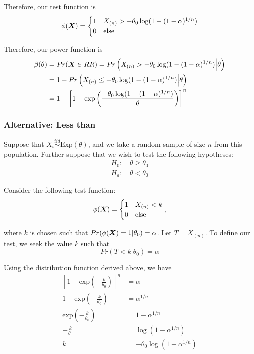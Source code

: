 \documentclass[]{article}
\newcommand{\bfX}{\mbox{\boldmath $X$}}
\begin{document}
Therefore, our test function is
\[
\phi(\bfX) = \begin{cases}
1 & X_{(n)} > -\theta_0\log(1 - (1-\alpha)^{1/n}) \\
0 & \text{else}
\end{cases}
\]

Therefore, our power function is
\[
\begin{split}
\beta(\theta) &= Pr(\bfX \in RR) = Pr\left(X_{(n)} > -\theta_0\log(1 - (1-\alpha)^{1/n}) \Big| \theta\right) \\
&= 1 - Pr\left(X_{(n)}\leq -\theta_0\log(1 - (1-\alpha)^{1/n}) \Big| \theta\right) \\
&= 1 - \left[1 - \text{exp}\left(\frac{-\theta_0\log(1 - (1-\alpha)^{1/n})}{\theta}\right)\right]^n
\end{split}
\]


\subsubsection{Alternative: Less than}

Suppose that $X_i \stackrel{iid}{\sim} \text{Exp}(\theta)$, and we take a random sample of size $n$ from this population. Further suppose that we wish to test the following hypotheses:
\[
\begin{split}
\text{$H_0$: }& \theta \geq \theta_0 \\
\text{$H_a$: }& \theta < \theta_0
\end{split}
\]

Consider the following test function:
\[
\phi(\bfX) = \begin{cases}
1 & X_{(n)} < k \\
0 & \text{else}
\end{cases},
\]

where $k$ is chosen such that $Pr(\phi(\bfX) = 1|\theta_0) = \alpha$. Let $T = X_{(n)}$. To define our test, we seek the value $k$ such that 
\[
Pr(T < k | \theta_0) = \alpha
\]

Using the distribution function derived above, we have
\[
\begin{split}
\left[1 - \text{exp}(-\frac{k}{\theta_0})\right]^n &= \alpha \\
1 - \text{exp}(-\frac{k}{\theta_0}) &= \alpha^{1/n} \\
\text{exp}(-\frac{k}{\theta_0}) &= 1 - \alpha^{1/n} \\
-\frac{k}{\theta_0} &= \log(1 - \alpha^{1/n}) \\
k &= -\theta_0\log(1 - \alpha^{1/n})
\end{split}
\]
\end{document}
